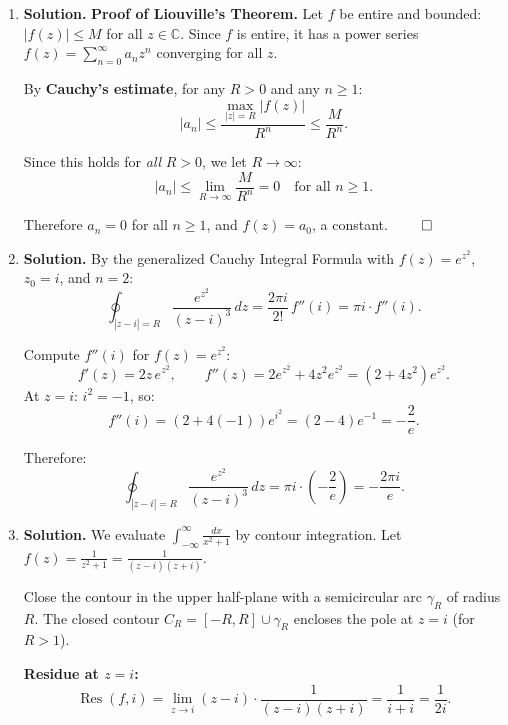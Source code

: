 \begin{enumerate}
By the Residue Theorem:
\[
\oint_{C_R} f(z)\,dz = 2\pi i \cdot \frac{1}{2i} = \pi.
\]
On $\gamma_R$: $|f(z)| \leq \frac{1}{R^2 - 1}$, so by the ML inequality, $\left|\int_{\gamma_R}f(z)\,dz\right| \leq \frac{\pi R}{R^2 - 1} \to 0$ as $R \to \infty$.

Therefore:
\[
\int_{-\infty}^{\infty}\frac{dx}{x^2+1} = \pi.
\]

\item \textbf{Solution.}
\textbf{Proof of Liouville's Theorem.} Let $f$ be entire and bounded: $|f(z)| \leq M$ for all $z \in \mathbb{C}$. Since $f$ is entire, it has a power series $f(z) = \sum_{n=0}^{\infty} a_n z^n$ converging for all $z$.

By \textbf{Cauchy's estimate}, for any $R > 0$ and any $n \geq 1$:
\[
|a_n| \leq \frac{\max_{|z|=R}|f(z)|}{R^n} \leq \frac{M}{R^n}.
\]

Since this holds for \emph{all} $R > 0$, we let $R \to \infty$:
\[
|a_n| \leq \lim_{R \to \infty} \frac{M}{R^n} = 0 \quad \text{for all } n \geq 1.
\]

Therefore $a_n = 0$ for all $n \geq 1$, and $f(z) = a_0$, a constant. $\qed$

\item \textbf{Solution.}
By the generalized Cauchy Integral Formula with $f(z) = e^{z^2}$, $z_0 = i$, and $n = 2$:
\[
\oint_{|z-i|=R} \frac{e^{z^2}}{(z-i)^3}\,dz = \frac{2\pi i}{2!}\,f''(i) = \pi i \cdot f''(i).
\]

Compute $f''(i)$ for $f(z) = e^{z^2}$:
\[
f'(z) = 2z\,e^{z^2}, \qquad f''(z) = 2e^{z^2} + 4z^2 e^{z^2} = (2 + 4z^2)e^{z^2}.
\]
At $z = i$: $i^2 = -1$, so:
\[
f''(i) = (2 + 4(-1))e^{i^2} = (2 - 4)e^{-1} = -\frac{2}{e}.
\]

Therefore:
\[
\oint_{|z-i|=R}\frac{e^{z^2}}{(z-i)^3}\,dz = \pi i \cdot \left(-\frac{2}{e}\right) = -\frac{2\pi i}{e}.
\]

\item \textbf{Solution.}
We evaluate $\int_{-\infty}^{\infty}\frac{dx}{x^2+1}$ by contour integration. Let $f(z) = \frac{1}{z^2+1} = \frac{1}{(z-i)(z+i)}$.

Close the contour in the upper half-plane with a semicircular arc $\gamma_R$ of radius $R$. The closed contour $C_R = [-R,R] \cup \gamma_R$ encloses the pole at $z = i$ (for $R > 1$).

\textbf{Residue at $z = i$:}
\[
\operatorname{Res}(f, i) = \lim_{z \to i}(z-i)\cdot\frac{1}{(z-i)(z+i)} = \frac{1}{i + i} = \frac{1}{2i}.
\]


\end{enumerate}

